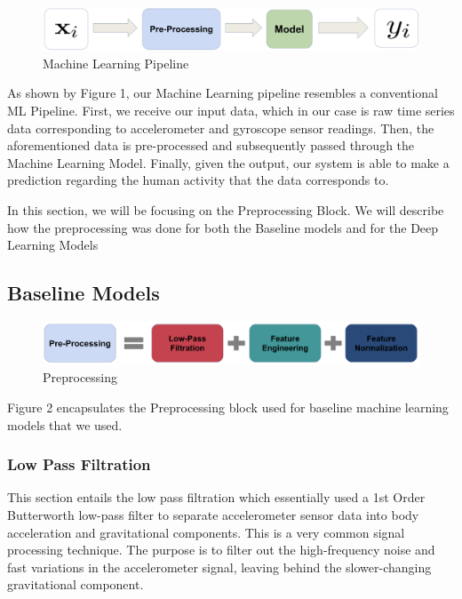 \documentclass[11pt]{article}
\begin{document}
\begin{figure}[h!]
	\includegraphics[width= 0.9 \linewidth]{ML Pipeline.png}
	\centering
	\caption{Machine Learning Pipeline}
	\label{ML Pipeline.png}
\end{figure}

As shown by Figure 1, our Machine Learning pipeline resembles a conventional ML Pipeline. First, we receive our input data, which in our case is raw time series data corresponding to accelerometer and gyroscope sensor readings. Then, the aforementioned data is pre-processed and subsequently passed through the Machine Learning Model. Finally, given the output, our system is able to make a prediction regarding the human activity that the data corresponds to. 

In this section, we will be focusing on the Preprocessing Block. We will describe how the preprocessing was done for both the Baseline models and for the Deep Learning Models  

\subsection{Baseline Models}

\begin{figure}[h!]
	\includegraphics[width= 0.9 \linewidth]{Preprocessing.png}
	\centering
	\caption{Preprocessing}
	\label{Preprocessing.png}
\end{figure}

Figure 2 encapsulates the Preprocessing block used for baseline machine learning models that we used.

\subsubsection{Low Pass Filtration}
This section entails the low pass filtration which essentially used a 1st Order Butterworth low-pass filter to separate accelerometer sensor data into body acceleration and gravitational components. This is a very common signal processing technique. The purpose is to filter out the high-frequency noise and fast variations in the accelerometer signal, leaving behind the slower-changing gravitational component. \newline 
\end{document}
